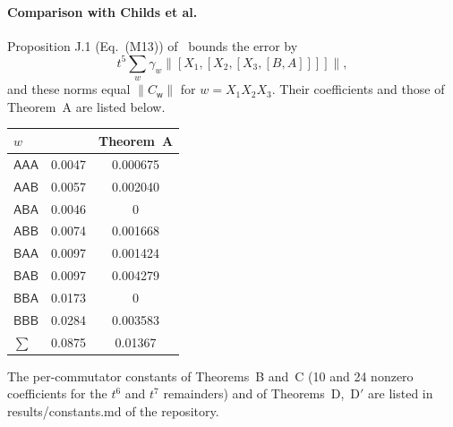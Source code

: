 \documentclass[11pt]{article}
\newcommand{\norm}[1]{\lVert #1\rVert}
\newcommand{\C}[1]{C_{\mathsf{#1}}}
\newcommand{\codeus}{\textunderscore\allowbreak}
\newcommand{\code}[1]{{\ttfamily\let\_\codeus\hyphenchar\font=-1 #1}}
\theoremstyle{plain}
\theoremstyle{definition}
\theoremstyle{remark}
\begin{document}
\begin{appendices}
\paragraph{Comparison with Childs et al.} Proposition J.1 (Eq.~(M13)) of~\cite{Childs2021} bounds the
error by
\[
t^5\sum_w\gamma_w\norm{[X_1,[X_2,[X_3,[B,A]]]]},
\]
and these norms equal $\norm{\C w}$ for $w=X_1X_2X_3$. Their coefficients and those of Theorem~A are
listed below.
\begin{center}\small
\begin{tabular}{@{}lcc@{}}
\toprule
$w$ & \cite{Childs2021} & Theorem~A\\
\midrule
$\mathsf{AAA}$ & 0.0047 & 0.000675\\
$\mathsf{AAB}$ & 0.0057 & 0.002040\\
$\mathsf{ABA}$ & 0.0046 & 0\\
$\mathsf{ABB}$ & 0.0074 & 0.001668\\
$\mathsf{BAA}$ & 0.0097 & 0.001424\\
$\mathsf{BAB}$ & 0.0097 & 0.004279\\
$\mathsf{BBA}$ & 0.0173 & 0\\
$\mathsf{BBB}$ & 0.0284 & 0.003583\\
\midrule
$\sum$ & 0.0875 & 0.01367\\
\bottomrule
\end{tabular}
\end{center}
The per-commutator constants of Theorems~B and~C (10 and 24 nonzero coefficients for the $t^6$ and $t^7$
remainders) and of Theorems~D,~D$'$ are listed in \code{results/constants.md} of the repository.

\end{appendices}
\end{document}

